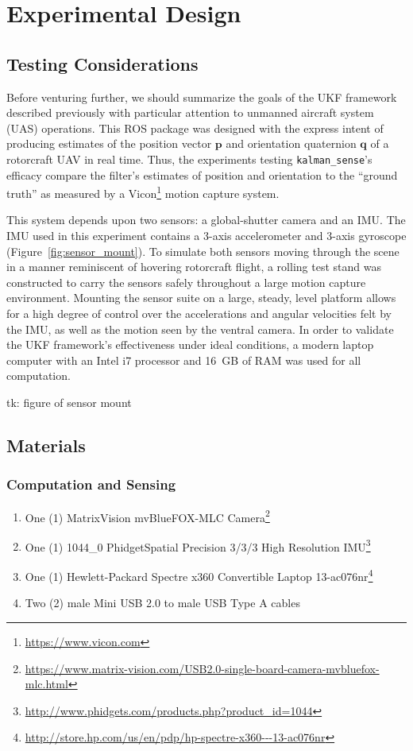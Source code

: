 \chapter{Experimental Design}

\section{Testing Considerations}

Before venturing further, we should summarize the goals of the UKF framework described previously with particular attention to unmanned aircraft system (UAS) operations. This ROS package was designed with the express intent of producing estimates of the position vector $\mathbf{p}$ and orientation quaternion $\mathbf{q}$ of a rotorcraft UAV in real time. Thus, the experiments testing \texttt{kalman\_sense}'s efficacy compare the filter's estimates of position and orientation to the ``ground truth'' as measured by a Vicon\footnote{\url{https://www.vicon.com}} motion capture system.

This system depends upon two sensors: a global-shutter camera and an IMU. The IMU used in this experiment contains a 3-axis accelerometer and 3-axis gyroscope (Figure~\ref{fig:sensor_mount}). To simulate both sensors moving through the scene in a manner reminiscent of hovering rotorcraft flight, a rolling test stand was constructed to carry the sensors safely throughout a large motion capture environment. Mounting the sensor suite on a large, steady, level platform allows for a high degree of control over the accelerations and angular velocities felt by the IMU, as well as the motion seen by the ventral camera. In order to validate the UKF framework's effectiveness under ideal conditions, a modern laptop computer with an Intel i7 processor and 16~GB of RAM was used for all computation.

tk: figure of sensor mount

\section{Materials}
\subsection{Computation and Sensing}
\begin{enumerate}
\item One (1) MatrixVision mvBlueFOX-MLC Camera\footnote{\url{https://www.matrix-vision.com/USB2.0-single-board-camera-mvbluefox-mlc.html}}
\item One (1) 1044\_0 PhidgetSpatial Precision 3/3/3 High Resolution IMU\footnote{\url{http://www.phidgets.com/products.php?product_id=1044}}
\item One (1) Hewlett-Packard Spectre x360 Convertible Laptop 13-ac076nr\footnote{\url{http://store.hp.com/us/en/pdp/hp-spectre-x360---13-ac076nr}}
\item Two (2) male Mini USB 2.0 to male USB Type A cables
\end{enumerate}

